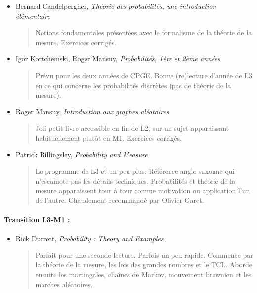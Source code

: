 \documentclass{article}
\begin{document}
\begin{itemize}
\item Bernard Candelpergher, \emph{Théorie des probabilités, une introduction élémentaire}
\begin{quote}
Notions fondamentales présentées avec le formalisme de la théorie de la mesure. Exercices corrigés.
\end{quote}
\item Igor Kortchemski, Roger Mansuy, \emph{Probabilités, 1ère et 2ème années}
\begin{quote}
Prévu pour les deux années de CPGE. Bonne (re)lecture d'année de L3 en ce qui concerne les probabilités discrètes (pas de théorie de la mesure).
\end{quote}
\item Roger Mansuy, \emph{Introduction aux graphes aléatoires}
\begin{quote}
Joli petit livre accessible en fin de L2, sur un sujet apparaissant habituellement plutôt en M1. Exercices corrigés.
\end{quote}
\item Patrick Billingsley, \emph{Probability and Measure}
\begin{quote}
Le programme de L3 et un peu plus. Référence anglo-saxonne qui n'escamote pas les détails techniques. Probabilités et théorie de la mesure apparaissent tour à tour comme motivation ou application l'un de l'autre. Chaudement recommandé par Olivier Garet.
\end{quote}

\end{itemize}
\paragraph{Transition L3-M1 : }
\begin{itemize}
\item Rick Durrett, \emph{Probability : Theory and Examples}
\begin{quote}
Parfait pour une seconde lecture. Parfois un peu rapide.  Commence par la théorie de la mesure, les lois des grandes nombres et le TCL. Aborde ensuite les martingales, chaînes de Markov, mouvement brownien et les marches aléatoires.
\end{quote}
\end{itemize}
\end{document}
